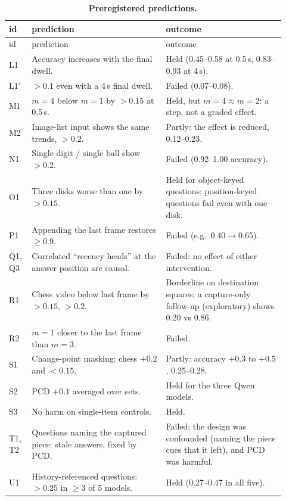 {\small
\begin{longtable}{p{0.07\linewidth}p{0.45\linewidth}p{0.4\linewidth}}
  \caption{\textbf{Preregistered predictions.}}\label{tab:prereg}\\
  \toprule
  id & prediction & outcome \\
  \midrule
  \endfirsthead
  \toprule
  id & prediction & outcome \\
  \midrule
  \endhead
  \bottomrule
  \endfoot
  L1 & Accuracy increases with the final dwell. & Held (0.45--0.58 at 0.5\,s, 0.83--0.93 at 4\,s). \\
  L1$'$ & \pstale{} $>0.1$ even with a 4\,s final dwell. & Failed (0.07--0.08). \\
  M1 & $m=4$ below $m=1$ by $>0.15$ at 0.5\,s. & Held, but $m=4\approx m=2$: a step, not a graded effect. \\
  M2 & Image-list input shows the same trends, \pstale{} $>0.2$. & Partly: the effect is reduced, \pstale{} 0.12--0.23. \\
  N1 & Single digit / single ball show \pstale{} $>0.2$. & Failed (0.92--1.00 accuracy). \\
  O1 & Three disks worse than one by $>0.15$. & Held for object-keyed questions; position-keyed questions fail even with one disk. \\
  P1 & Appending the last frame restores $\ge0.9$. & Failed (e.g.\ 0.40$\to$0.65). \\
  Q1, Q3 & Correlated ``recency heads'' at the answer position are causal. & Failed: no effect of either intervention. \\
  R1 & Chess video below last frame by $>0.15$, \pstale{} $>0.2$. & Borderline on destination squares; a capture-only follow-up (exploratory) shows 0.20 vs 0.86. \\
  R2 & $m=1$ closer to the last frame than $m=3$. & Failed. \\
  S1 & Change-point masking: chess $+0.2$ and \pstale{} $<0.15$. & Partly: accuracy $+0.3$ to $+0.5$, \pstale{} 0.25--0.28. \\
  S2 & PCD $+0.1$ averaged over sets. & Held for the three Qwen models. \\
  S3 & No harm on single-item controls. & Held. \\
  T1, T2 & Questions naming the captured piece: stale answers, fixed by PCD. & Failed; the design was confounded (naming the piece cues that it left), and PCD was harmful. \\
  U1 & History-referenced questions: \pstale{} $>0.25$ in $\ge3$ of 5 models. & Held (0.27--0.47 in all five). \\

\end{longtable}}
